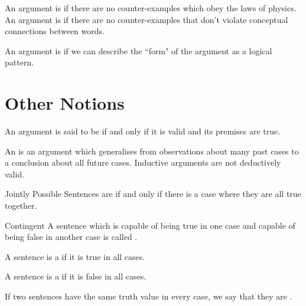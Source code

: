 \documentclass[12pt, a4paper, twoside, openright, titlepage]{book}
\begin{document}
\begin{rmk}{}{}
    An argument is  if there are no counter-examples which obey the laws of physics. An argument is  if there are no counter-examples that don't violate conceptual connections between words.
\end{rmk}


\begin{rmk}{}{}
    An argument is  if we can describe the ``form" of the argument as a logical pattern.
\end{rmk}

\section{\textsection Other Notions}

\begin{defn}{}{}
    An argument is said to be  if and only if it is valid and its premises are true.
\end{defn}


\begin{defn}{}{}
    An  is an argument which generalises from observations about many past cases to a conclusion about all future cases. Inductive arguments are not deductively valid.
\end{defn}

\begin{defn}{Jointly Possible}{}
    Sentences are  if and only if there is a case where they are all true together.
\end{defn}

\begin{defn}{Contingent}{}
    A sentence which is capable of being true in one case and capable of being false in another case is called .
\end{defn}

\begin{defn}{}{}
    A sentence is a  if it is true in all cases.
\end{defn}

\begin{defn}{}{}
    A sentence is a  if it is false in all cases.
\end{defn}

\begin{defn}{}{}
    If two sentences have the same truth value in every case, we say that they are .
\end{defn}
\end{document}
